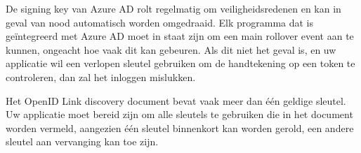 De signing key van Azure AD rolt regelmatig om veiligheidsredenen en kan in geval van nood automatisch worden omgedraaid. Elk programma dat is geïntegreerd met Azure AD moet in staat zijn om een main rollover event aan te kunnen, ongeacht hoe vaak dit kan gebeuren. Als dit niet het geval is, en uw applicatie wil een verlopen sleutel gebruiken om de handtekening op een token te controleren, dan zal het inloggen mislukken.

Het OpenID Link discovery document bevat vaak meer dan één geldige sleutel. Uw applicatie moet bereid zijn om alle sleutels te gebruiken die in het document worden vermeld, aangezien één sleutel binnenkort kan worden gerold, een andere sleutel aan vervanging kan toe zijn.
